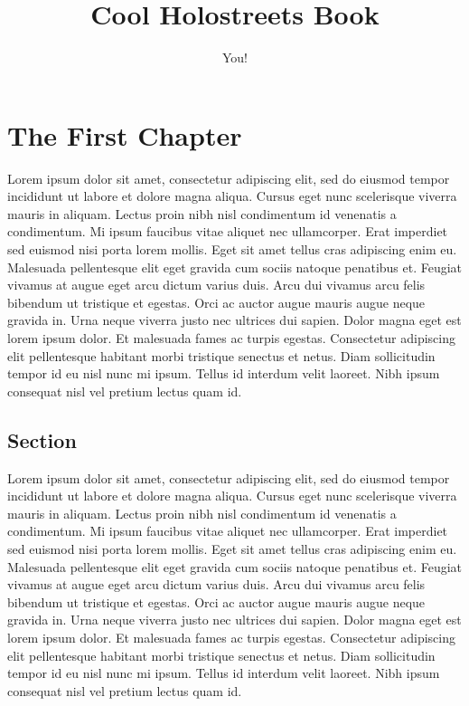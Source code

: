 \documentclass[red, openany, logo-1e]{shadowrun}
\title{Cool Holostreets Book}
\author{You!}
\begin{document}
\maketitle
\tableofcontents

\chapter{The First Chapter}
Lorem ipsum dolor sit amet, consectetur adipiscing elit, sed do eiusmod tempor incididunt ut labore et dolore magna aliqua. Cursus eget nunc scelerisque viverra mauris in aliquam. Lectus proin nibh nisl condimentum id venenatis a condimentum. Mi ipsum faucibus vitae aliquet nec ullamcorper. Erat imperdiet sed euismod nisi porta lorem mollis. Eget sit amet tellus cras adipiscing enim eu. Malesuada pellentesque elit eget gravida cum sociis natoque penatibus et. Feugiat vivamus at augue eget arcu dictum varius duis. Arcu dui vivamus arcu felis bibendum ut tristique et egestas. Orci ac auctor augue mauris augue neque gravida in. Urna neque viverra justo nec ultrices dui sapien. Dolor magna eget est lorem ipsum dolor. Et malesuada fames ac turpis egestas. Consectetur adipiscing elit pellentesque habitant morbi tristique senectus et netus. Diam sollicitudin tempor id eu nisl nunc mi ipsum. Tellus id interdum velit laoreet. Nibh ipsum consequat nisl vel pretium lectus quam id.

\section{Section}
Lorem ipsum dolor sit amet, consectetur adipiscing elit, sed do eiusmod tempor incididunt ut labore et dolore magna aliqua. Cursus eget nunc scelerisque viverra mauris in aliquam. Lectus proin nibh nisl condimentum id venenatis a condimentum. Mi ipsum faucibus vitae aliquet nec ullamcorper. Erat imperdiet sed euismod nisi porta lorem mollis. Eget sit amet tellus cras adipiscing enim eu. Malesuada pellentesque elit eget gravida cum sociis natoque penatibus et. Feugiat vivamus at augue eget arcu dictum varius duis. Arcu dui vivamus arcu felis bibendum ut tristique et egestas. Orci ac auctor augue mauris augue neque gravida in. Urna neque viverra justo nec ultrices dui sapien. Dolor magna eget est lorem ipsum dolor. Et malesuada fames ac turpis egestas. Consectetur adipiscing elit pellentesque habitant morbi tristique senectus et netus. Diam sollicitudin tempor id eu nisl nunc mi ipsum. Tellus id interdum velit laoreet. Nibh ipsum consequat nisl vel pretium lectus quam id.
\end{document}
